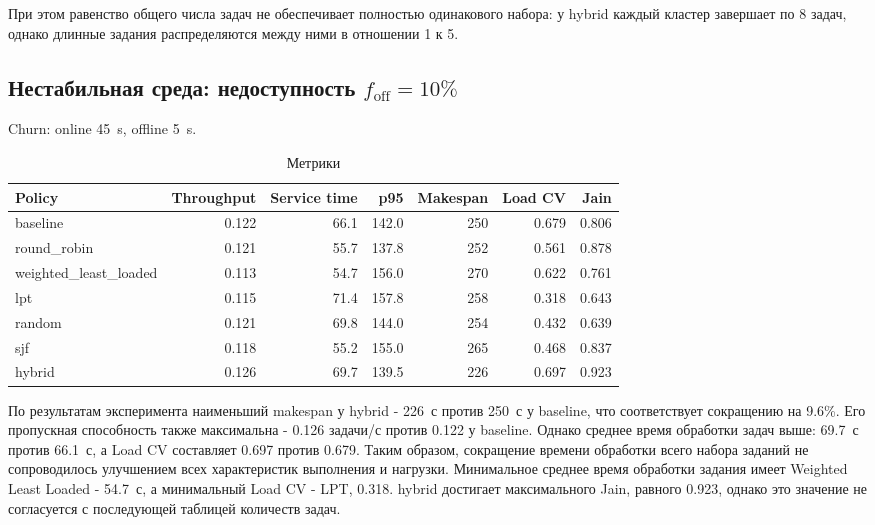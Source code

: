 \documentclass[a4paper,12pt]{extarticle}
\begin{document}
При этом равенство общего числа задач не обеспечивает полностью одинакового набора: у hybrid каждый кластер завершает по 8 задач, однако длинные задания распределяются между ними в отношении 1 к 5.

\subsection{Нестабильная среда: недоступность $f_{\text{off}}=10\%$}
Churn: online 45~s, offline 5~s.

\begin{table}[H]
\centering
    \caption{Метрики}
\footnotesize
\begin{tabular}{lrrrrrr}
\toprule
Policy & Throughput & Service time & p95 & Makespan & Load CV & Jain \\
\midrule
    baseline & 0.122 & 66.1 & 142.0 & 250 & 0.679 & 0.806 \\
    round\_robin & 0.121 & 55.7 & 137.8 & 252 & 0.561 & 0.878 \\
    weighted\_least\_loaded & 0.113 & 54.7 & 156.0 & 270 & 0.622 & 0.761 \\
    lpt & 0.115 & 71.4 & 157.8 & 258 & 0.318 & 0.643 \\
    random & 0.121 & 69.8 & 144.0 & 254 & 0.432 & 0.639 \\
    sjf & 0.118 & 55.2 & 155.0 & 265 & 0.468 & 0.837 \\
    hybrid & 0.126 & 69.7 & 139.5 & 226 & 0.697 & 0.923 \\
\bottomrule
\end{tabular}
\end{table}

По результатам эксперимента наименьший makespan у hybrid - 226~с против 250~с у baseline, что соответствует сокращению на 9.6\%. Его пропускная способность также максимальна - 0.126 задачи/с против 0.122 у baseline. Однако среднее время обработки задач выше: 69.7~с против 66.1~с, а Load CV составляет 0.697 против 0.679. Таким образом, сокращение времени обработки всего набора заданий не сопроводилось улучшением всех характеристик выполнения и нагрузки. Минимальное среднее время обработки задания имеет Weighted Least Loaded - 54.7~с, а минимальный Load CV - LPT, 0.318. hybrid достигает максимального Jain, равного 0.923, однако это значение не согласуется с последующей таблицей количеств задач.
\end{document}
